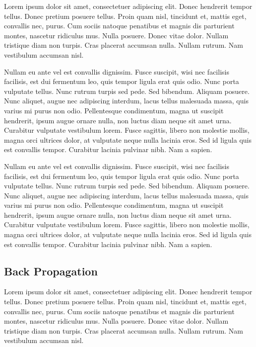 Lorem ipsum dolor sit amet, consectetuer adipiscing elit.  Donec
hendrerit tempor tellus.  Donec pretium posuere tellus.  Proin quam
nisl, tincidunt et, mattis eget, convallis nec, purus.  Cum sociis
natoque penatibus et magnis dis parturient montes, nascetur ridiculus
mus.  Nulla posuere.  Donec vitae dolor.  Nullam tristique diam non
turpis.  Cras placerat accumsan nulla.  Nullam rutrum.  Nam vestibulum
accumsan nisl.


Nullam eu ante vel est convallis dignissim.  Fusce suscipit, wisi nec
facilisis facilisis, est dui fermentum leo, quis tempor ligula erat
quis odio.  Nunc porta vulputate tellus.  Nunc rutrum turpis sed pede.
Sed bibendum.  Aliquam posuere.  Nunc aliquet, augue nec adipiscing
interdum, lacus tellus malesuada massa, quis varius mi purus non odio.
Pellentesque condimentum, magna ut suscipit hendrerit, ipsum augue
ornare nulla, non luctus diam neque sit amet urna.  Curabitur
vulputate vestibulum lorem.  Fusce sagittis, libero non molestie
mollis, magna orci ultrices dolor, at vulputate neque nulla lacinia
eros.  Sed id ligula quis est convallis tempor.  Curabitur lacinia
pulvinar nibh.  Nam a sapien.


Nullam eu ante vel est convallis dignissim.  Fusce suscipit, wisi nec
facilisis facilisis, est dui fermentum leo, quis tempor ligula erat
quis odio.  Nunc porta vulputate tellus.  Nunc rutrum turpis sed pede.
Sed bibendum.  Aliquam posuere.  Nunc aliquet, augue nec adipiscing
interdum, lacus tellus malesuada massa, quis varius mi purus non odio.
Pellentesque condimentum, magna ut suscipit hendrerit, ipsum augue
ornare nulla, non luctus diam neque sit amet urna.  Curabitur
vulputate vestibulum lorem.  Fusce sagittis, libero non molestie
mollis, magna orci ultrices dolor, at vulputate neque nulla lacinia
eros.  Sed id ligula quis est convallis tempor.  Curabitur lacinia
pulvinar nibh.  Nam a sapien.



\subsection{Back Propagation}

Lorem ipsum dolor sit amet, consectetuer adipiscing elit.  Donec
hendrerit tempor tellus.  Donec pretium posuere tellus.  Proin quam
nisl, tincidunt et, mattis eget, convallis nec, purus.  Cum sociis
natoque penatibus et magnis dis parturient montes, nascetur ridiculus
mus.  Nulla posuere.  Donec vitae dolor.  Nullam tristique diam non
turpis.  Cras placerat accumsan nulla.  Nullam rutrum.  Nam vestibulum
accumsan nisl.

